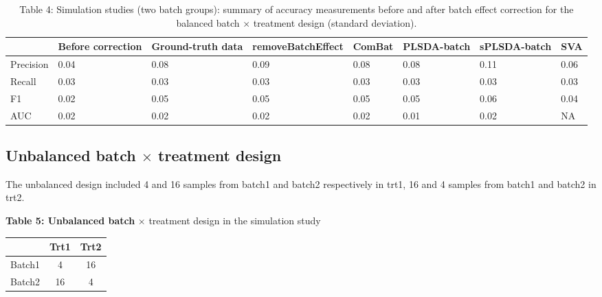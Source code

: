 \documentclass[
]{book}
\begin{document}
\begin{table}

\caption{\label{tab:unnamed-chunk-115}Table 4: Simulation studies (two batch groups): summary of accuracy measurements before and after batch effect correction for the balanced batch × treatment design (standard deviation).}
\centering
\begin{tabular}[t]{l|l|l|l|l|l|l|l}
\hline
  & Before correction & Ground-truth data & removeBatchEffect & ComBat & PLSDA-batch & sPLSDA-batch & SVA\\
\hline
Precision & 0.04 & 0.08 & 0.09 & 0.08 & 0.08 & 0.11 & 0.06\\
\hline
Recall & 0.03 & 0.03 & 0.03 & 0.03 & 0.03 & 0.03 & 0.03\\
\hline
F1 & 0.02 & 0.05 & 0.05 & 0.05 & 0.05 & 0.06 & 0.04\\
\hline
AUC & 0.02 & 0.02 & 0.02 & 0.02 & 0.01 & 0.02 & NA\\
\hline
\end{tabular}
\end{table}

\hypertarget{unbalanced-batch-times-treatment-design-1}{%
\subsection{\texorpdfstring{Unbalanced batch \(\times\) treatment design}{Unbalanced batch \textbackslash times treatment design}}\label{unbalanced-batch-times-treatment-design-1}}

The unbalanced design included 4 and 16 samples from batch1 and batch2 respectively in trt1, 16 and 4 samples from batch1 and batch2 in trt2.

\textbf{Table 5: Unbalanced batch} \(\times\) treatment design in the simulation study

\begin{longtable}[]{@{}ccc@{}}
\toprule()
& Trt1 & Trt2 \\
\midrule()
\endhead
Batch1 & 4 & 16 \\
Batch2 & 16 & 4 \\
\bottomrule()
\end{longtable}
\end{document}
